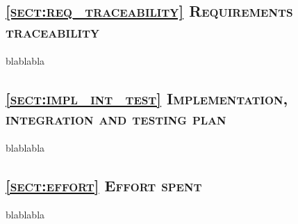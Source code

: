 \subsection*{\textsc{\textcolor{myblue}{\ref{sect:req_traceability} Requirements traceability}}}
blablabla

\subsection*{\textsc{\textcolor{myblue}{\ref{sect:impl_int_test} Implementation, integration and testing plan}}}
blablabla


\subsection*{\textsc{\textcolor{myblue}{\ref{sect:effort} Effort spent}}}
blablabla

